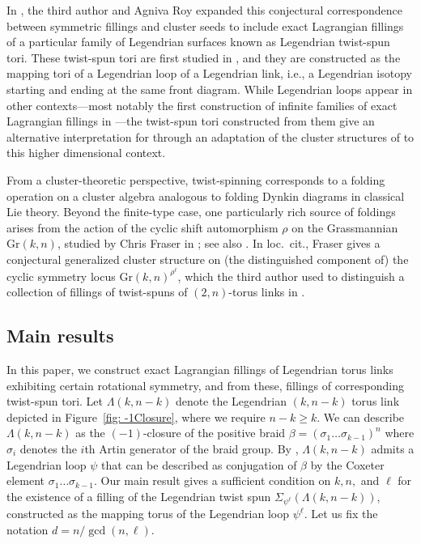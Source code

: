 \documentclass[11pt]{amsart}
\newcommand{\La}{\Lambda}
\newcommand{\Gr}{\text{Gr}}
\theoremstyle{plain}
\theoremstyle{definition}
\begin{document}
In \cite{HughesRoy}, the third author and Agniva Roy expanded this conjectural correspondence between symmetric fillings and cluster seeds to include exact Lagrangian fillings of a particular family of Legendrian surfaces known as Legendrian twist-spun tori. These twist-spun tori are first studied in \cite{EK}, and they are constructed as the mapping tori of a Legendrian loop of a Legendrian link, i.e., a Legendrian isotopy starting and ending at the same front diagram. While Legendrian loops appear in other contexts---most notably the first construction of infinite families of exact Lagrangian fillings in \cite{CasalsGao}---the twist-spun tori constructed from them give an alternative interpretation for \cite[Conjecture 5.4]{CasalsLagSkel} through an adaptation of the cluster structures of \cite{CasalsWeng} to this higher dimensional context. 

From a cluster-theoretic perspective, twist-spinning corresponds to a folding operation on a cluster algebra analogous to folding Dynkin diagrams in classical Lie theory. Beyond the finite-type case, one particularly rich source of foldings arises from the action of the cyclic shift automorphism $\rho$ on the Grassmannian $\Gr(k, n)$, studied by Chris Fraser in \cite{Fraser2020}; see also \cite{KaufmanSpecialFolding}. In loc.\ cit., Fraser gives a conjectural generalized cluster structure on (the distinguished component of) the cyclic symmetry locus $\Gr(k, n)^{\rho^\ell}$, which the third author used to distinguish a collection of fillings of twist-spuns of $(2, n)$-torus links in \cite{HughesRoy}.

\subsection{Main results}
In this paper, we construct exact Lagrangian fillings of Legendrian torus links exhibiting certain rotational symmetry, and from these, fillings of corresponding twist-spun tori. Let $\La(k, n-k)$ denote the Legendrian $(k, n-k)$ torus link depicted in Figure~\ref{fig: -1Closure}, where we require $n-k\geq k$. We can describe $\La(k, n-k)$ as  the $(-1)$-closure of the positive braid $\beta=(\sigma_1\dots \sigma_{k-1})^{n}$ where $\sigma_i$ denotes the $i$th Artin generator of the braid group.
 By \cite{Kalman2005}, $\La(k, n-k)$ admits a Legendrian loop $\psi$ that can be described as conjugation of $\beta$ by the Coxeter element $\sigma_1\dots\sigma_{k-1}$. Our main result gives a sufficient condition on $k, n,$ and $\ell$ for the existence of a filling of the Legendrian twist spun $\Sigma_{\psi^\ell}(\La(k, n-k))$,  constructed as the mapping torus of the Legendrian loop $\psi^\ell$. Let us fix the notation $d=n/\gcd(n, \ell)$.
 
\end{document}
